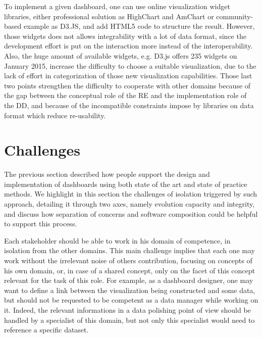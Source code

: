 \documentclass{acm_proc_article-sp}
\begin{document}
To implement a given dashboard, one can use online visualization widget
libraries, either professional solution as HighChart and AmChart or
community-based example as D3.JS, and add HTML5 code to structure the
result.
However, those widgets does not allows integrability with a lot of data format,
since the development effort is put on the interaction more instead of the interoperability.
Also, the huge amount of available widgets, e.g. D3.js offers 235 widgets on
January 2015, increase the difficulty to choose a suitable visualization,
due to the lack of effort in categorization of those new visualization
capabilities\cite{ecmfa}.
Those last two points strengthen the difficulty to cooperate with other domains
because of the gap between the conceptual role of the RE and the implementation
role of the DD, and because of the incompatible constraints impose by libraries
on data format which reduce re-usability.

\section{Challenges}

The previous section described how people support the design and
implementation of dashboards using both state of the art and state of
practice methods. We highlight in this section the challenges of isolation
triggered by such approach, detailing it through two axes, namely evolution
capacity and integrity, and discuss how separation of concerns and
software composition could be helpful to support this process.

Each stakeholder should be able to work in his domain of competence,
in isolation from the other domains. This main challenge implies that
each one may work without the irrelevant noise of others contribution,
focusing on concepts of his own domain, or, in case of a shared concept,
only on the facet of this concept relevant for the task of this role.
For example, as a dashboard designer, one may want to define a link
between the visualization being constructed and some data, but should
not be requested to be competent as a data manager while working on it.
Indeed, the relevant informations in a data polishing point of view should
be handled by a specialist of this domain, but not only this specialist
would need to reference a specific dataset.
\end{document}
